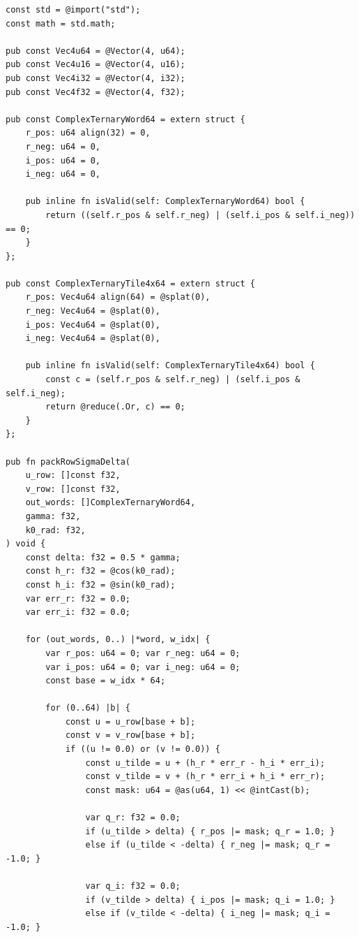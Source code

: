\documentclass[10pt, twocolumn, a4paper]{article}
\begin{document}
\begin{lstlisting}[caption={Zero-Allocation Zig $\Sigma\Delta$ Bit-Plane Packer and 4-Row SIMD Contraction Kernel.}]
const std = @import("std");
const math = std.math;

pub const Vec4u64 = @Vector(4, u64);
pub const Vec4u16 = @Vector(4, u16);
pub const Vec4i32 = @Vector(4, i32);
pub const Vec4f32 = @Vector(4, f32);

pub const ComplexTernaryWord64 = extern struct {
    r_pos: u64 align(32) = 0,
    r_neg: u64 = 0,
    i_pos: u64 = 0,
    i_neg: u64 = 0,

    pub inline fn isValid(self: ComplexTernaryWord64) bool {
        return ((self.r_pos & self.r_neg) | (self.i_pos & self.i_neg)) == 0;
    }
};

pub const ComplexTernaryTile4x64 = extern struct {
    r_pos: Vec4u64 align(64) = @splat(0),
    r_neg: Vec4u64 = @splat(0),
    i_pos: Vec4u64 = @splat(0),
    i_neg: Vec4u64 = @splat(0),

    pub inline fn isValid(self: ComplexTernaryTile4x64) bool {
        const c = (self.r_pos & self.r_neg) | (self.i_pos & self.i_neg);
        return @reduce(.Or, c) == 0;
    }
};

pub fn packRowSigmaDelta(
    u_row: []const f32,
    v_row: []const f32,
    out_words: []ComplexTernaryWord64,
    gamma: f32,
    k0_rad: f32,
) void {
    const delta: f32 = 0.5 * gamma;
    const h_r: f32 = @cos(k0_rad);
    const h_i: f32 = @sin(k0_rad);
    var err_r: f32 = 0.0;
    var err_i: f32 = 0.0;

    for (out_words, 0..) |*word, w_idx| {
        var r_pos: u64 = 0; var r_neg: u64 = 0;
        var i_pos: u64 = 0; var i_neg: u64 = 0;
        const base = w_idx * 64;

        for (0..64) |b| {
            const u = u_row[base + b];
            const v = v_row[base + b];
            if ((u != 0.0) or (v != 0.0)) {
                const u_tilde = u + (h_r * err_r - h_i * err_i);
                const v_tilde = v + (h_r * err_i + h_i * err_r);
                const mask: u64 = @as(u64, 1) << @intCast(b);

                var q_r: f32 = 0.0;
                if (u_tilde > delta) { r_pos |= mask; q_r = 1.0; }
                else if (u_tilde < -delta) { r_neg |= mask; q_r = -1.0; }

                var q_i: f32 = 0.0;
                if (v_tilde > delta) { i_pos |= mask; q_i = 1.0; }
                else if (v_tilde < -delta) { i_neg |= mask; q_i = -1.0; }


\end{lstlisting}
\end{document}
